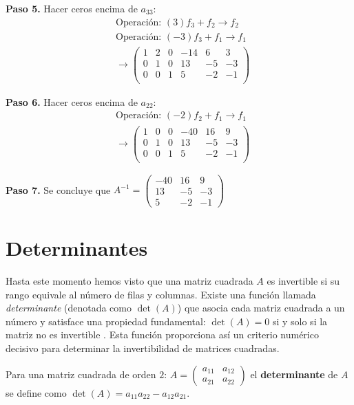 \begin{example}
\begin{myproof}
\textbf{Paso 5.} Hacer ceros encima de \(a_{33}\):
\begin{align*}
& \text{Operación: } (3)f_3 + f_2 \to f_2 \\
& \text{Operación: } (-3)f_3 + f_1 \to f_1 \\
& \rightarrow \left(\begin{array}{ccc|ccc}
1 & 2 & 0 & -14 & 6 & 3 \\
0 & 1 & 0 & 13 & -5 & -3 \\
0 & 0 & 1 & 5 & -2 & -1 \\
\end{array}\right)
\end{align*}

\textbf{Paso 6.} Hacer ceros encima de \(a_{22}\):
\begin{align*}
& \text{Operación: } (-2)f_2 + f_1 \to f_1 \\
& \rightarrow \left(\begin{array}{ccc|ccc}
\boxed{1} & 0 & 0 & -40 & 16 & 9 \\
0 & \boxed{1} & 0 & 13 & -5 & -3 \\
0 & 0 & \boxed{1} & 5 & -2 & -1 \\
\end{array}\right)
\end{align*}

\textbf{Paso 7.} Se concluye que \(\boxed{A^{-1} = \begin{pmatrix} -40 & 16 & 9 \\ 13 & -5 & -3 \\ 5 & -2 & -1 \end{pmatrix}}\)
\end{myproof}
\end{example}

\section{Determinantes}
Hasta este momento hemos visto que una matriz cuadrada $A$ es invertible si su rango equivale al número de filas y columnas. Existe una función llamada \textit{determinante} (denotada como \(\det(A)\)) que asocia cada matriz cuadrada a un número y satisface una propiedad fundamental: \(\det(A) = 0\) si y solo si la matriz no es invertible \cite{araujo2014algebra}. Esta función proporciona así un criterio numérico decisivo para determinar la invertibilidad de matrices cuadradas.

\begin{definition}
\label{def:det2x2}
Para una matriz cuadrada de orden \(2\): \(
A = \begin{pmatrix}
a_{11} & a_{12} \\
a_{21} & a_{22}
\end{pmatrix}
\) el \textbf{determinante} de \(A\) se define como \(
\det(A) = a_{11}a_{22} - a_{12}a_{21}.
\)
\end{definition}

